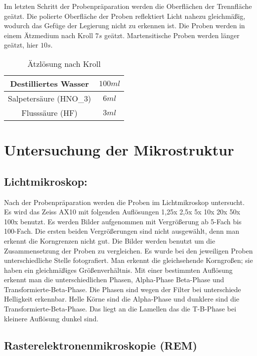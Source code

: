Im letzten Schritt der Probenpräparation werden die Oberflächen der Trennfläche geätzt. Die polierte Oberfläche der Proben reflektiert Licht nahezu gleichmäßig, wodurch das Gefüge der Legierung nicht zu erkennen ist. 
Die Proben werden in einem Ätzmedium nach Kroll $7s$ geätzt. Martensitische Proben werden länger geätzt, hier $10s$. 

\begin{table}[h]
	\centering
	\begin{tabular}{|c|c|}
		
		\hline 
		Destilliertes Wasser
		& $100ml$
		\\ 
		\hline 
		Salpetersäure (HNO_{3})	& $6ml$
		\\ 
		\hline 
		Flusssäure (HF) & $3ml$
		\\ 
		\hline 
	\end{tabular} 
	\caption{Ätzlösung nach Kroll}
	\label{tab:Ätz_Kroll}
\end{table}


\section{Untersuchung der Mikrostruktur}

\subsection{Lichtmikroskop:}
Nach der Probenpräparation werden die Proben im Lichtmikroskop untersucht. Es wird das Zeiss AX10 mit folgenden Auflösungen 1,25x 2,5x 5x 10x 20x 50x 100x benutzt. Es werden Bilder aufgenommen mit Vergrößerung ab 5-Fach bis 100-Fach. Die ersten beiden Vergrößerungen sind nicht ausgewählt, denn man erkennt die Korngrenzen nicht gut. Die Bilder werden benutzt um die Zusammensetzung der Proben zu vergleichen. 
Es wurde bei den jeweiligen Proben unterschiedliche Stelle fotografiert. Man erkennt die gleichsehende Korngroßen; sie haben ein gleichmäßiges Größenverhältnis. Mit einer bestimmten Auflösung erkennt man die unterschiedlichen Phasen, Alpha-Phase Beta-Phase und Transformierte-Beta-Phase. Die Phasen sind wegen der Filter bei unterschiede Helligkeit erkennbar. Helle Körne sind die Alpha-Phase und dunklere sind die Transformierte-Beta-Phase. Das liegt an die Lamellen das die T-B-Phase bei kleinere Auflösung dunkel sind. 


\subsection{Rasterelektronenmikroskopie (REM)}


